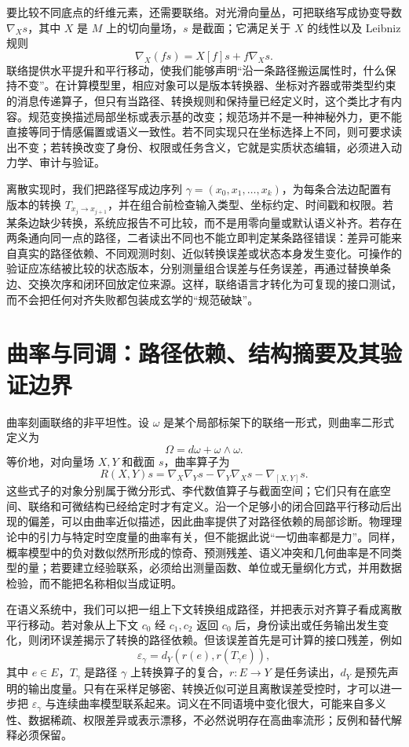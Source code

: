要比较不同底点的纤维元素，还需要联络。对光滑向量丛，可把联络写成协变导数 $\nabla_Xs$，其中 $X$ 是 $M$ 上的切向量场，$s$ 是截面；它满足关于 $X$ 的线性以及 Leibniz 规则
\[
  \nabla_X(fs)=X[f]s+f\nabla_Xs.
\]
联络提供水平提升和平行移动，使我们能够声明“沿一条路径搬运属性时，什么保持不变”。在计算模型里，相应对象可以是版本转换器、坐标对齐器或带类型约束的消息传递算子，但只有当路径、转换规则和保持量已经定义时，这个类比才有内容。规范变换描述局部坐标或表示基的改变；规范场并不是一种神秘外力，更不能直接等同于情感偏置或语义一致性。若不同实现只在坐标选择上不同，则可要求读出不变；若转换改变了身份、权限或任务含义，它就是实质状态编辑，必须进入动力学、审计与验证。

离散实现时，我们把路径写成边序列 $\gamma=(x_0,x_1,\ldots,x_k)$，为每条合法边配置有版本的转换 $T_{x_j\to x_{j+1}}$，并在组合前检查输入类型、坐标约定、时间戳和权限。若某条边缺少转换，系统应报告不可比较，而不是用零向量或默认语义补齐。若存在两条通向同一点的路径，二者读出不同也不能立即判定某条路径错误：差异可能来自真实的路径依赖、不同观测时刻、近似转换误差或状态本身发生变化。可操作的验证应冻结被比较的状态版本，分别测量组合误差与任务误差，再通过替换单条边、交换次序和闭环回放定位来源。这样，联络语言才转化为可复现的接口测试，而不会把任何对齐失败都包装成玄学的“规范破缺”。

\section{曲率与同调：路径依赖、结构摘要及其验证边界}

曲率刻画联络的非平坦性。设 $\omega$ 是某个局部标架下的联络一形式，则曲率二形式定义为
\[
  \Omega=d\omega+\omega\wedge\omega.
\]
等价地，对向量场 $X,Y$ 和截面 $s$，曲率算子为
\[
  R(X,Y)s=\nabla_X\nabla_Ys-\nabla_Y\nabla_Xs-\nabla_{[X,Y]}s.
\]
这些式子的对象分别属于微分形式、李代数值算子与截面空间；它们只有在底空间、联络和可微结构已经给定时才有定义。沿一个足够小的闭合回路平行移动后出现的偏差，可以由曲率近似描述，因此曲率提供了对路径依赖的局部诊断。物理理论中的引力与特定时空度量的曲率有关，但不能据此说“一切曲率都是力”。同样，概率模型中的负对数似然所形成的惊奇、预测残差、语义冲突和几何曲率是不同类型的量；若要建立经验联系，必须给出测量函数、单位或无量纲化方式，并用数据检验，而不能把名称相似当成证明。

在语义系统中，我们可以把一组上下文转换组成路径，并把表示对齐算子看成离散平行移动。若对象从上下文 $c_0$ 经 $c_1,c_2$ 返回 $c_0$ 后，身份读出或任务输出发生变化，则闭环误差揭示了转换的路径依赖。但该误差首先是可计算的接口残差，例如
\[
  \varepsilon_\gamma
  =d_Y\!\left(r(e),r(T_\gamma e)\right),
\]
其中 $e\in E$，$T_\gamma$ 是路径 $\gamma$ 上转换算子的复合，$r:E\to Y$ 是任务读出，$d_Y$ 是预先声明的输出度量。只有在采样足够密、转换近似可逆且离散误差受控时，才可以进一步把 $\varepsilon_\gamma$ 与连续曲率模型联系起来。词义在不同语境中变化很大，可能来自多义性、数据稀疏、权限差异或表示漂移，不必然说明存在高曲率流形；反例和替代解释必须保留。

